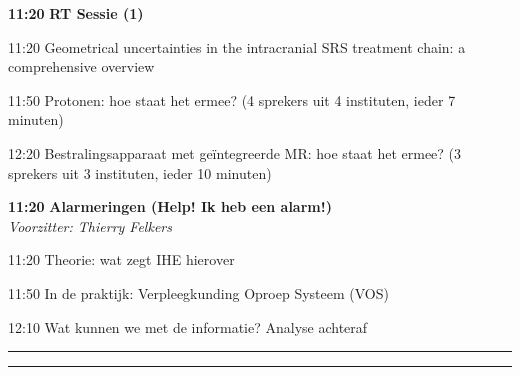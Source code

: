\documentclass[a4paper,10pt]{report}
\begin{document}
\begin{multicols*}{3}
\vfill

\begin{packed_enum}
\item[\textbf{11:20}] \textbf{RT Sessie (1)}
\item[11:20] Geometrical uncertainties in the intracranial SRS treatment chain: a comprehensive overview
\item[11:50] Protonen: hoe staat het ermee? (4 sprekers uit 4 instituten, ieder 7 minuten)
\item[12:20] Bestralingsapparaat met geïntegreerde MR: hoe staat het ermee? (3 sprekers uit 3 instituten, ieder 10 minuten)
\end{packed_enum} %

\vfill

\begin{packed_enum}
\item[\textbf{11:20}] \textbf{Alarmeringen (Help! Ik heb een alarm!)}\\\textit{Voorzitter: Thierry Felkers}
\item[11:20] Theorie: wat zegt IHE hierover
\item[11:50] In de praktijk: Verpleegkunding Oproep Systeem (VOS)
\item[12:10] Wat kunnen we met de informatie? Analyse achteraf
\end{packed_enum} %

\columnbreak

\hrule \vspace{2mm}
\vspace{2mm}\hrule\strut


\end{multicols*}
\end{document}
